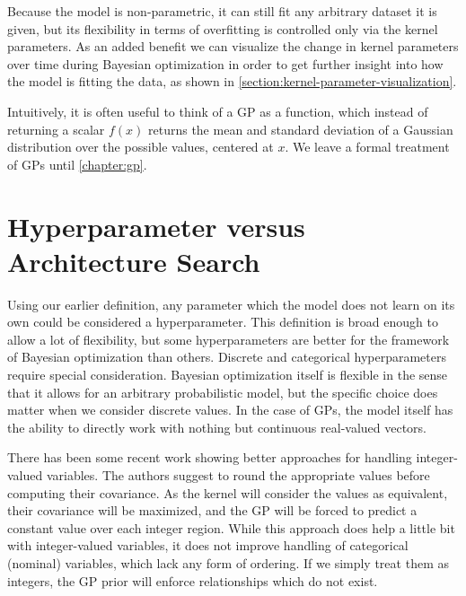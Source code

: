 Because the model is non-parametric, it can still fit any arbitrary dataset it is given, but its flexibility in terms of overfitting is controlled only via the kernel parameters. As an added benefit we can visualize the change in kernel parameters over time during Bayesian optimization in order to get further insight into how the model is fitting the data, as shown in \autoref{section:kernel-parameter-visualization}.

Intuitively, it is often useful to think of a GP as a function, which instead
of returning a scalar $f(x)$ returns the mean and standard deviation of a
Gaussian distribution over the possible values, centered at $x$. We leave a formal
treatment of GPs until \autoref{chapter:gp}.


%
%
%
%
%

\section{Hyperparameter versus Architecture Search}
\label{section:architecture-search}

Using our earlier definition, any parameter which the model does not learn on
its own could be considered a hyperparameter. This definition is broad enough
to allow a lot of flexibility, but some hyperparameters are better for the
framework of Bayesian optimization than others. Discrete and categorical
hyperparameters require special consideration. Bayesian optimization itself is
flexible in the sense that it allows for an arbitrary probabilistic model, but
the specific choice does matter when we consider discrete values. In the case
of GPs, the model itself has the ability to directly work with nothing
but continuous real-valued vectors.

There has been some recent work \citep{integer-valued-gp} showing better
approaches for handling integer-valued variables. The authors suggest to
round the appropriate values before computing their covariance. As the
kernel will consider the values as equivalent, their covariance will be maximized,
and the GP will be forced to predict a constant value over each integer region.
While this approach does help a little bit with integer-valued variables, it
does not improve handling of categorical (nominal) variables, which lack any form of
ordering. If we simply treat them as integers, the GP prior will enforce
relationships which do not exist.

